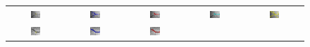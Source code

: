 \begin{figure}[t]
\centering
\renewcommand{\tabcolsep}{0.05cm}
\begin{tabular}{@{}ccccc@{}}
\includegraphics[width=0.19\textwidth]{images/L2S_compare_region/19_orig}	&
\includegraphics[width=0.19\textwidth]{images/L2S_compare_region/19_CV}	&
\includegraphics[width=0.19\textwidth]{images/L2S_compare_region/19_Lankton}		&
\includegraphics[width=0.19\textwidth]{images/L2S_compare_region/19_Li}	&
\includegraphics[width=0.19\textwidth]{images/L2S_compare_region/19_ours}	
\\
\includegraphics[width=0.19\textwidth]{images/L2S_compare_region/22_trng_orig}	&
\includegraphics[width=0.19\textwidth]{images/L2S_compare_region/22_trng_CV}	&
\includegraphics[width=0.19\textwidth]{images/L2S_compare_region/22_trng_Lankton}		&

\end{tabular}
\end{figure}
